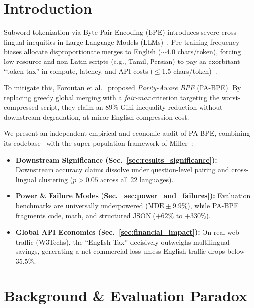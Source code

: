 
\section{Introduction}
\label{sec:intro}

Subword tokenization via Byte-Pair Encoding (BPE) introduces severe cross-lingual inequities in Large Language Models (LLMs)~\cite{petrov2023language,ahia2023all}. Pre-training frequency biases allocate disproportionate merges to English ($\sim$4.0 chars/token), forcing low-resource and non-Latin scripts (e.g., Tamil, Persian) to pay an exorbitant ``token tax'' in compute, latency, and API costs ($\le$1.5 chars/token)~\cite{ahia2023all,nllb2022no}.

To mitigate this, Foroutan et al.~\cite{foroutan2026parity} proposed \textit{Parity-Aware BPE} (PA-BPE). By replacing greedy global merging with a \textit{fair-max} criterion targeting the worst-compressed script, they claim an $89\%$ Gini inequality reduction without downstream degradation, at minor English compression cost.

We present an independent empirical and economic audit of PA-BPE, combining its codebase~\cite{foroutan2026parity} with the super-population framework of Miller~\cite{miller2024adding}:
\begin{itemize}
    \item \textbf{Downstream Significance (Sec.~\ref{sec:results_significance}):} Downstream accuracy claims dissolve under question-level pairing and cross-lingual clustering ($p > 0.05$ across all 22 languages).
    \item \textbf{Power \& Failure Modes (Sec.~\ref{sec:power_and_failures}):} Evaluation benchmarks are universally underpowered ($\mathrm{MDE} \pm 9.9\%$), while PA-BPE fragments code, math, and structured JSON ($+62\%$ to $+330\%$).
    \item \textbf{Global API Economics (Sec.~\ref{sec:financial_impact}):} On real web traffic (W3Techs), the ``English Tax'' decisively outweighs multilingual savings, generating a net commercial loss unless English traffic drops below $35.5\%$.
\end{itemize}

\section{Background \& Evaluation Paradox}
\label{sec:background}

